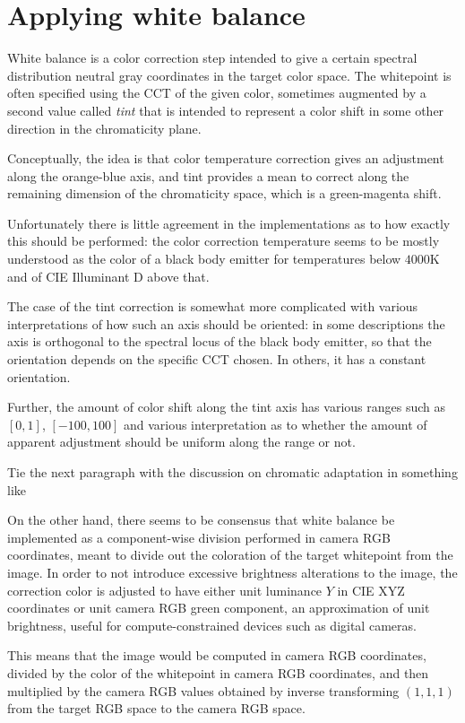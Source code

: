 \section{Applying white balance}
White balance is a color correction step intended to give a certain spectral distribution 
 neutral gray coordinates in the target color space.
The whitepoint is often specified using the \gls{CCT} of the given color,
sometimes augmented by a second value called \textsl{tint} that is intended to represent a color shift 
in some other direction in the chromaticity plane. 
    
Conceptually, the idea is that color temperature correction gives an adjustment along the orange-blue axis, 
and tint provides a mean to correct along the remaining dimension of the chromaticity space, 
which is a green-magenta shift.

Unfortunately there is little agreement in the implementations as to how exactly this should be performed:
the color correction temperature seems to be mostly understood as the color of a black body emitter for
temperatures below $4000\unit{\kelvin}$ and of \gls{CIE} Illuminant D above that. 

The case of the tint correction is somewhat more complicated with various interpretations 
of how such an axis should be oriented: in some descriptions the axis is orthogonal to the 
spectral locus of the black body emitter, so that the orientation depends on the specific 
\gls{CCT} chosen. In others, it has a constant orientation. 

Further, the amount of color shift along the tint axis has various ranges such as $[0,1]$, 
$[-100,100]$ and various interpretation as to whether the amount of apparent adjustment should be 
uniform along the range or not.

\begin{inconstruction}
	Tie the next paragraph with the discussion on chromatic adaptation in
	something like \cite{fairchild2013}
\end{inconstruction}

On the other hand, there seems to be consensus that white balance be implemented as a component-wise
division performed in camera \gls{RGB} coordinates, meant to divide out the coloration of the target
whitepoint from the image. In order to not introduce excessive brightness alterations
to the image, the correction color is adjusted to have either unit luminance $Y$ in \gls{CIE} \gls{XYZ} 
coordinates or unit camera \gls{RGB} green component, an approximation of unit brightness, 
useful for compute-constrained devices such as digital cameras. 

This means that the image would be computed in camera \gls{RGB} coordinates, divided by the color of 
the whitepoint in camera \gls{RGB} coordinates, and then multiplied by the camera \gls{RGB} values 
obtained by inverse transforming $(1,1,1)$ from the target \gls{RGB} space to the camera \gls{RGB} 
space.

